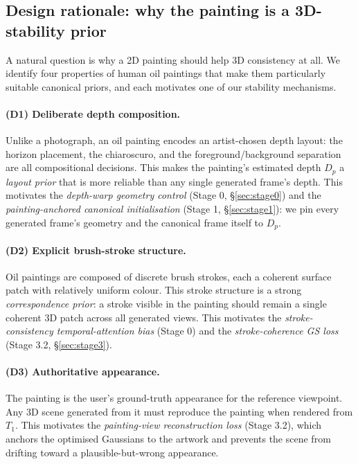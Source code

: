 \documentclass[10pt,twocolumn,letterpaper]{article}
\begin{document}
\subsection{Design rationale: why the painting is a 3D-stability prior}
\label{sec:design}

A natural question is why a 2D painting should help 3D consistency at all.
We identify four properties of human oil paintings that make them
particularly suitable canonical priors, and each motivates one of our
stability mechanisms.

\paragraph{(D1) Deliberate depth composition.}
Unlike a photograph, an oil painting encodes an artist-chosen depth layout:
the horizon placement, the chiaroscuro, and the foreground/background
separation are all compositional decisions. This makes the painting's
estimated depth $D_p$ a \emph{layout prior} that is more reliable than any
single generated frame's depth. This motivates the \emph{depth-warp geometry
control} (Stage 0, \S\ref{sec:stage0}) and the \emph{painting-anchored
canonical initialisation} (Stage 1, \S\ref{sec:stage1}): we pin every
generated frame's geometry and the canonical frame itself to $D_p$.

\paragraph{(D2) Explicit brush-stroke structure.}
Oil paintings are composed of discrete brush strokes, each a coherent surface
patch with relatively uniform colour. This stroke structure is a strong
\emph{correspondence prior}: a stroke visible in the painting should remain a
single coherent 3D patch across all generated views. This motivates the
\emph{stroke-consistency temporal-attention bias} (Stage 0) and the
\emph{stroke-coherence GS loss} (Stage 3.2, \S\ref{sec:stage3}).

\paragraph{(D3) Authoritative appearance.}
The painting is the user's ground-truth appearance for the reference
viewpoint. Any 3D scene generated from it must reproduce the painting when
rendered from $T_1$. This motivates the \emph{painting-view reconstruction
loss} (Stage 3.2), which anchors the optimised Gaussians to the artwork and
prevents the scene from drifting toward a plausible-but-wrong appearance.
\end{document}
